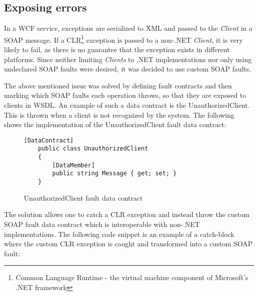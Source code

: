 \documentclass[../report.tex]{subfiles}
\begin{document}
\subsection{Exposing errors}
In a WCF service, exceptions are serialized to XML and passed to the \textit{Client} in a SOAP message. If a CLR\footnote{Common Language Runtime - the virtual machine component of Microsoft's .NET framework} exception is passed to a non-.NET \textit{Client}, it is very likely to fail, as there is no guarantee that the exception exists in different platforms. Since neither limiting \textit{Clients} to .NET implementations nor only using undeclared SOAP faults were desired, it was decided to use custom SOAP faults.

The above mentioned issue was solved by defining fault contracts and then marking which SOAP faults each operation throws, so that they are exposed to clients in WSDL. An example of such a data contract is the UnauthorizedClient. This is thrown when a client is not recognized by the system. The following shows the implementation of the UnauthorizedClient fault data contract:


\begin{figure}[H]
\begin{lstlisting}[frame=tb]
    [DataContract]
    public class UnauthorizedClient
    {
        [DataMember]
        public string Message { get; set; }
    }
\end{lstlisting}
\caption{UnauthorizedClient fault data contract}
\end{figure}



The solution allows one to catch a CLR exception and instead throw the custom SOAP fault data contract which is interoperable with non-.NET implementations. The following code snippet is an example of a catch-block where the custom CLR exception is caught and transformed into a custom SOAP fault:
\end{document}
